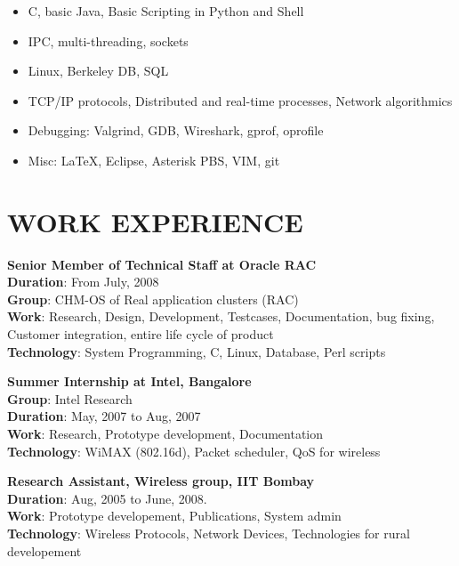 \documentclass{res}
\begin{document}
\begin{resume}
					  \begin{itemize}
					  \item C, basic Java, Basic Scripting in Python and Shell 
					  \item IPC, multi-threading, sockets
					  \item Linux, Berkeley DB, SQL
					  \item TCP/IP protocols, Distributed and real-time processes, Network algorithmics
				          \item Debugging: Valgrind, GDB, Wireshark, gprof, oprofile 
					  \item Misc: \LaTeX, Eclipse, Asterisk PBS, VIM, git
					  \end{itemize}

					  \section{WORK EXPERIENCE} 
					  {\bf Senior Member of Technical Staff at Oracle RAC}
					  \\{\bf Duration}:  From July, 2008\\
					  {\bf Group}: CHM-OS of Real application clusters (RAC)\\ 
					  {\bf Work}: Research, Design, Development, Testcases, Documentation, bug fixing, Customer integration, entire life cycle of product\\
					  {\bf Technology}: System Programming, C, Linux, Database, Perl scripts

					  {\bf Summer Internship at Intel, Bangalore}\\
					  {\bf Group}: Intel Research 
					  \\{\bf Duration}: May, 2007 to Aug, 2007
					  \\{\bf Work}: Research, Prototype development, Documentation
					  \\{\bf Technology}: WiMAX (802.16d), Packet scheduler, QoS for wireless


					  {\bf Research Assistant, Wireless group, IIT Bombay} 
					  \\{\bf Duration}: Aug, 2005 to June, 2008.
					  \\{\bf Work}: Prototype developement, Publications, System admin
					  \\{\bf Technology}: Wireless Protocols, Network Devices, Technologies for rural developement  


\end{resume}
\end{document}
